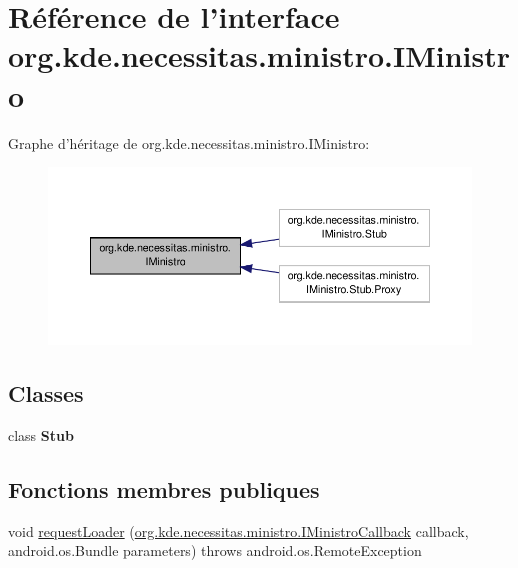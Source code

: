 \hypertarget{interfaceorg_1_1kde_1_1necessitas_1_1ministro_1_1_i_ministro}{\section{Référence de l'interface org.\-kde.\-necessitas.\-ministro.\-I\-Ministro}
\label{interfaceorg_1_1kde_1_1necessitas_1_1ministro_1_1_i_ministro}
}


Graphe d'héritage de org.\-kde.\-necessitas.\-ministro.\-I\-Ministro\-:\nopagebreak
\begin{figure}[H]
\begin{center}
\leavevmode
\includegraphics[width=350pt]{interfaceorg_1_1kde_1_1necessitas_1_1ministro_1_1_i_ministro__inherit__graph}
\end{center}
\end{figure}
\subsection*{Classes}
\begin{DoxyCompactItemize}
\item 
class {\bfseries Stub}
\end{DoxyCompactItemize}
\subsection*{Fonctions membres publiques}
\begin{DoxyCompactItemize}
\item 
void \hyperlink{interfaceorg_1_1kde_1_1necessitas_1_1ministro_1_1_i_ministro_a3d7c6602e2f6151d53df20f674b97af1}{request\-Loader} (\hyperlink{interfaceorg_1_1kde_1_1necessitas_1_1ministro_1_1_i_ministro_callback}{org.\-kde.\-necessitas.\-ministro.\-I\-Ministro\-Callback} callback, android.\-os.\-Bundle parameters)  throws android.\-os.\-Remote\-Exception
\end{DoxyCompactItemize}


